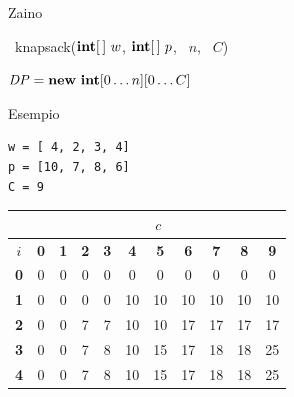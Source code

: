 \begin{frame}{Zaino}

\vspace{-9pt}
\begin{Procedure}
\caption[A]{\INTEGER\ \textsf{knapsack}($\INTEGER[\,]\ w$, $\INTEGER[\,]\ p$, \INTEGER\ $n$, \INTEGER\ $C$)}

$\mathit{DP} = \NEW\ \INTEGER[0 \ldots n][0 \ldots C]$\;
\;
\end{Procedure}

\end{frame}


\begin{frame}[fragile]{Esempio}

\begin{lstlisting}
w = [ 4, 2, 3, 4]
p = [10, 7, 8, 6]
C = 9  
\end{lstlisting}

\bigskip
\begin{tabular}{|c|c|c|c|c|c|c|c|c|c|c|}
\hline
& \multicolumn{10}{c|}{$c$} \\\hline
$i$ & \textbf{0} & \textbf{1} & \textbf{2} & \textbf{3} & \textbf{4} & \textbf{5} & \textbf{6} & \textbf{7} & \textbf{8} & \textbf{9}  \\\hline
\textbf{0} & 0 &  0 &  0 &  0 &  0 &  0 &  0 &  0 &  0 &  0 \\\hline
\textbf{1} & 0 &  0 &  0 &  0 & 10 & 10 & 10 & 10 & 10 & 10 \\\hline
\textbf{2} & 0 &  0 &  7 &  7 & 10 & 10 & 17 & 17 & 17 & 17 \\\hline
\textbf{3} & 0 &  0 &  7 &  8 & 10 & 15 & 17 & 18 & 18 & 25 \\\hline
\textbf{4} & 0 &  0 &  7 &  8 & 10 & 15 & 17 & 18 & 18 & 25 \\\hline  
\end{tabular}  

\end{frame}

